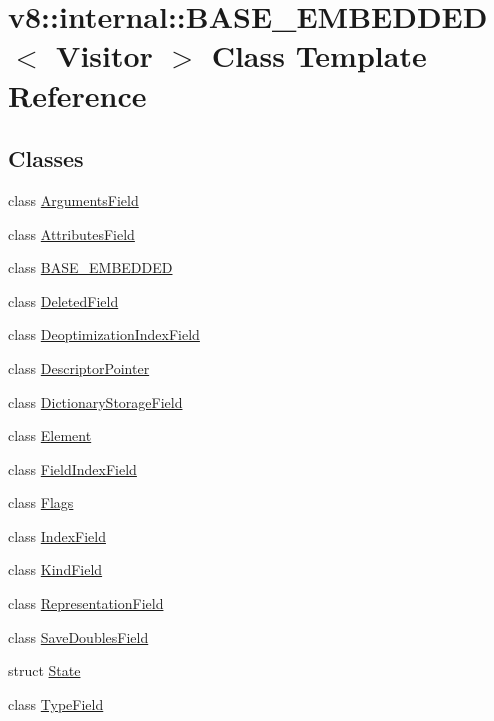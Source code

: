 \hypertarget{classv8_1_1internal_1_1_b_a_s_e___e_m_b_e_d_d_e_d}{}\section{v8\+:\+:internal\+:\+:B\+A\+S\+E\+\_\+\+E\+M\+B\+E\+D\+D\+E\+D$<$ Visitor $>$ Class Template Reference}
\label{classv8_1_1internal_1_1_b_a_s_e___e_m_b_e_d_d_e_d}
\subsection*{Classes}
\begin{DoxyCompactItemize}
\item 
class \hyperlink{classv8_1_1internal_1_1_b_a_s_e___e_m_b_e_d_d_e_d_1_1_arguments_field}{Arguments\+Field}
\item 
class \hyperlink{classv8_1_1internal_1_1_b_a_s_e___e_m_b_e_d_d_e_d_1_1_attributes_field}{Attributes\+Field}
\item 
class \hyperlink{classv8_1_1internal_1_1_b_a_s_e___e_m_b_e_d_d_e_d_1_1_b_a_s_e___e_m_b_e_d_d_e_d}{B\+A\+S\+E\+\_\+\+E\+M\+B\+E\+D\+D\+E\+D}
\item 
class \hyperlink{classv8_1_1internal_1_1_b_a_s_e___e_m_b_e_d_d_e_d_1_1_deleted_field}{Deleted\+Field}
\item 
class \hyperlink{classv8_1_1internal_1_1_b_a_s_e___e_m_b_e_d_d_e_d_1_1_deoptimization_index_field}{Deoptimization\+Index\+Field}
\item 
class \hyperlink{classv8_1_1internal_1_1_b_a_s_e___e_m_b_e_d_d_e_d_1_1_descriptor_pointer}{Descriptor\+Pointer}
\item 
class \hyperlink{classv8_1_1internal_1_1_b_a_s_e___e_m_b_e_d_d_e_d_1_1_dictionary_storage_field}{Dictionary\+Storage\+Field}
\item 
class \hyperlink{classv8_1_1internal_1_1_b_a_s_e___e_m_b_e_d_d_e_d_1_1_element}{Element}
\item 
class \hyperlink{classv8_1_1internal_1_1_b_a_s_e___e_m_b_e_d_d_e_d_1_1_field_index_field}{Field\+Index\+Field}
\item 
class \hyperlink{classv8_1_1internal_1_1_b_a_s_e___e_m_b_e_d_d_e_d_1_1_flags}{Flags}
\item 
class \hyperlink{classv8_1_1internal_1_1_b_a_s_e___e_m_b_e_d_d_e_d_1_1_index_field}{Index\+Field}
\item 
class \hyperlink{classv8_1_1internal_1_1_b_a_s_e___e_m_b_e_d_d_e_d_1_1_kind_field}{Kind\+Field}
\item 
class \hyperlink{classv8_1_1internal_1_1_b_a_s_e___e_m_b_e_d_d_e_d_1_1_representation_field}{Representation\+Field}
\item 
class \hyperlink{classv8_1_1internal_1_1_b_a_s_e___e_m_b_e_d_d_e_d_1_1_save_doubles_field}{Save\+Doubles\+Field}
\item 
struct \hyperlink{structv8_1_1internal_1_1_b_a_s_e___e_m_b_e_d_d_e_d_1_1_state}{State}
\item 
class \hyperlink{classv8_1_1internal_1_1_b_a_s_e___e_m_b_e_d_d_e_d_1_1_type_field}{Type\+Field}
\end{DoxyCompactItemize}
